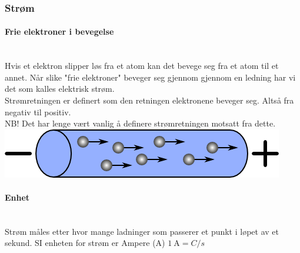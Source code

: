 \subsubsection{Strøm}
\paragraph{Frie elektroner i bevegelse} \mbox{} \\
Hvis et elektron slipper løs fra et atom kan det bevege seg fra et atom til et annet.
Når slike "frie elektroner" beveger seg gjennom gjennom en ledning
har vi det som kalles elektrisk strøm.
\\

Strømretningen er definert som den retningen elektronene beveger seg.
Altså fra negativ til positiv.\\
NB! Det har lenge vært vanlig å definere strømretningen motsatt fra dette.
\\
\includegraphics[scale=0.5]{./img/current}

\paragraph{Enhet} \mbox{} \\
Strøm måles etter hvor mange ladninger som passerer et punkt
i løpet av et sekund.
SI enheten for strøm er Ampere (A) \hfill $\SI{1}{\ampere} = C/s$

